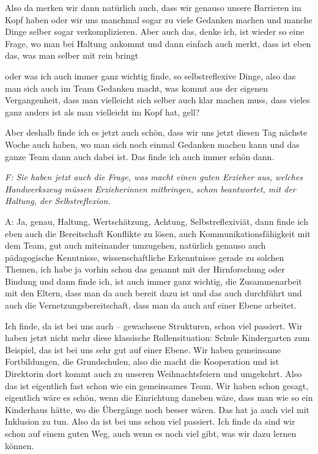 \begin{linenumbers*}
Also da merken wir dann natürlich auch, dass wir genauso unsere Barrieren im Kopf haben oder wir uns manchmal sogar zu viele Gedanken machen und manche Dinge selber sogar verkomplizieren. Aber auch das, denke ich, ist wieder so eine Frage, wo man bei Haltung ankommt und dann einfach auch merkt, dass ist eben das, was man selber mit rein 
bringt 

oder was ich auch immer ganz wichtig finde, so selbstreflexive Dinge, also das man sich auch im Team Gedanken macht, was kommt aus der eigenen Vergangenheit, dass man vielleicht sich selber auch klar machen muss, dass vieles ganz anders ist als man vielleicht im Kopf hat, gell? 

Aber deshalb finde ich es jetzt auch schön, dass wir uns jetzt diesen Tag nächste Woche auch haben, wo man sich noch einmal Gedanken machen kann und das ganze Team dann auch dabei ist. Das finde ich auch immer schön dann.

\emph{F: Sie haben jetzt auch die Frage, was macht einen guten Erzieher aus, welches Handwerkszeug müssen Erzieherinnen mitbringen, schon beantwortet, mit der Haltung, der Selbstreflexion.}

A: Ja, genau, Haltung, Wertschätzung, Achtung, Selbstreflexiviät, dann finde ich eben auch die Bereitschaft Konflikte zu lösen, auch Kommunikationsfähigkeit mit dem Team, gut auch miteinander umzugehen, natürlich genauso auch pädagogische Kenntnisse, wissenschaftliche Erkenntnisse gerade zu solchen Themen, ich habe ja vorhin schon das genannt mit der Hirnforschung oder Bindung und dann finde ich, ist auch immer ganz wichtig, die Zusammenarbeit mit den Eltern, dass man da auch bereit dazu ist und das auch durchführt und auch die Vernetzungsbereitschaft, dass man da auch auf einer Ebene arbeitet. 

Ich finde, da ist bei uns auch -- gewachsene Strukturen, schon viel passiert. Wir haben jetzt nicht mehr diese klassische Rollensituation: Schule Kindergarten zum Beispiel, das ist bei uns sehr gut auf einer Ebene. Wir haben gemeinsame Fortbildungen, die Grundschulen, also die macht die Kooperation und ist Direktorin dort kommt auch zu unseren Weihnachtsfeiern und umgekehrt. Also das ist eigentlich fast schon wie ein gemeinsames Team. Wir haben schon gesagt, eigentlich wäre es schön, wenn die Einrichtung daneben wäre, dass man wie so ein Kinderhaus hätte, wo die Übergänge noch besser wären. Das hat ja auch viel mit Inklusion zu tun. Also da ist bei uns schon viel passiert. Ich finde da sind wir schon auf einem guten Weg, auch wenn es noch viel gibt, was wir dazu lernen können. 


\end{linenumbers*}
